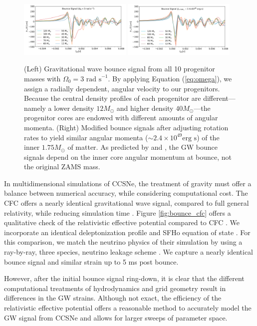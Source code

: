 \documentclass[twocolumn,times]{aastex62}  %
\begin{document}
\begin{figure}[t]
  \centering     %
  \includegraphics[width=0.48\textwidth]{figures/hd3_bounce_test.pdf}
  \includegraphics[width=0.48\textwidth]{figures/hdj_bounce_final.pdf}
  \caption{(Left) Gravitational wave bounce signal from all 10 progenitor masses with $\Omega_0 = 3 \text{ rad s}^{-1}$.  By applying Equation (\ref{eq:omega}), we assign a radially dependent, angular velocity to our progenitors.  Because the central density profiles of each progenitor are different---namely a lower density $12 M_\odot$ and higher density $40 M_\odot$---the progenitor cores are endowed with different amounts of angular momenta.   (Right) Modified bounce signals after adjusting rotation rates to yield similar angular momenta ($\sim 2.4\times10^{49} \text{erg s}$) of the inner $1.75 M_\odot$ of matter.  As predicted by \citet{dimm:2008} and \citet{abdik:2010,abdik:2014}, the GW bounce signals depend on the inner core angular momentum at bounce, not the original ZAMS mass.}
  \label{fig:bounce}
\end{figure}

In multidimensional simulations of CCSNe, the treatment of gravity must offer a balance between numerical accuracy, while considering computational cost.   The CFC offers a nearly identical gravitational wave signal, compared to full general relativity, while reducing simulation time \citep{ott:2007}.  Figure \ref{fig:bounce_cfc} offers a qualitative check of the relativistic effective potential compared to CFC \citep{richers:2017}.  We incorporate an identical deleptonization profile \citep{lieb:2005} and SFHo equation of state \citep{steiner:2013}.  For this comparison, we match the neutrino physics of their simulation by using a ray-by-ray, three species, neutrino leakage scheme \citep{oconnor:2010,couch:2014}.  We capture a nearly identical bounce signal and similar strain up to 5 ms post bounce. \par
However, after the initial bounce signal ring-down, it is clear that the different computational treatments of hydrodynamics and grid geometry result in differences in the GW strains.  Although not exact, the efficiency of the relativistic effective potential offers a reasonable method to accurately model the GW signal from CCSNe and allows for larger sweeps of parameter space.
\end{document}
